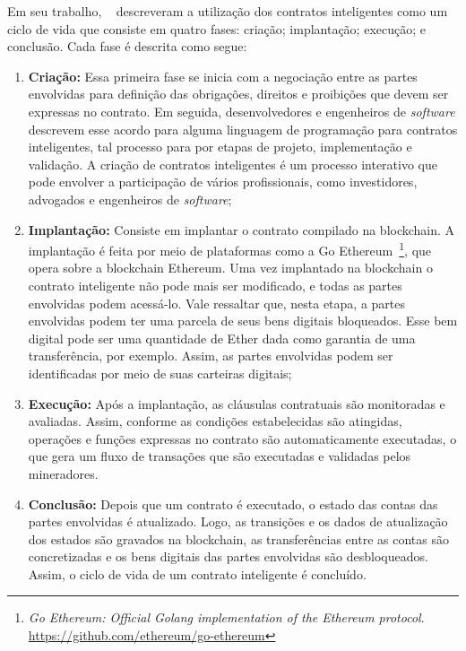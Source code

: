 Em seu trabalho, ~ descreveram a utilização dos contratos inteligentes como um ciclo de vida que consiste em quatro fases: criação; implantação; execução; e conclusão. Cada fase é descrita como segue:
\begin{enumerate}
    \item \textbf{Criação:} Essa primeira fase se inicia com a negociação entre as partes envolvidas para definição das obrigações, direitos e proibições que devem ser expressas no contrato. Em seguida, desenvolvedores e engenheiros de \textit{software} descrevem esse acordo para alguma linguagem de programação para contratos inteligentes, tal processo para por etapas de projeto, implementação e validação. A criação de contratos inteligentes é um processo interativo que pode envolver a participação de vários profissionais, como investidores, advogados e engenheiros de \textit{software};
    \item \textbf{Implantação:} Consiste em implantar o contrato compilado na blockchain. A implantação é feita por meio de plataformas como a Go Ethereum~\footnote{\textit{Go Ethereum: Official Golang implementation of the Ethereum protocol}. \url{https://github.com/ethereum/go-ethereum}}, que opera sobre a blockchain Ethereum. Uma vez implantado na blockchain o contrato inteligente não pode mais ser modificado, e todas as partes envolvidas podem acessá-lo. Vale ressaltar que, nesta etapa, a partes envolvidas podem ter uma parcela de seus bens digitais bloqueados. Esse bem digital pode ser uma quantidade de Ether dada como garantia de uma transferência, por exemplo. Assim, as partes envolvidas podem ser identificadas por meio de suas carteiras digitais; 
    \item \textbf{Execução:} Após a implantação, as cláusulas contratuais são monitoradas e avaliadas. Assim, conforme as condições estabelecidas são atingidas, operações e funções expressas no contrato são automaticamente executadas, o que gera um fluxo de transações que são executadas e validadas pelos mineradores.
    \item \textbf{Conclusão:} Depois que um contrato é executado, o estado das contas das partes envolvidas é atualizado. Logo, as transições e os dados de atualização dos estados são gravados na blockchain, as transferências entre as contas são concretizadas e os bens digitais das partes envolvidas são desbloqueados. Assim, o ciclo de vida de um contrato inteligente é concluído. 
\end{enumerate}

